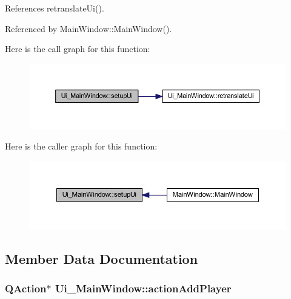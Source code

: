 References retranslate\+Ui().



Referenced by Main\+Window\+::\+Main\+Window().



Here is the call graph for this function\+:
\nopagebreak
\begin{figure}[H]
\begin{center}
\leavevmode
\includegraphics[width=350pt]{df/dd7/class_ui___main_window_acf4a0872c4c77d8f43a2ec66ed849b58_cgraph}
\end{center}
\end{figure}




Here is the caller graph for this function\+:
\nopagebreak
\begin{figure}[H]
\begin{center}
\leavevmode
\includegraphics[width=350pt]{df/dd7/class_ui___main_window_acf4a0872c4c77d8f43a2ec66ed849b58_icgraph}
\end{center}
\end{figure}




\subsection{Member Data Documentation}
\hypertarget{class_ui___main_window_af1f8925b955d4b219fed6f1a99b06cdd}{}
\subsubsection[{action\+Add\+Player}]{\setlength{\rightskip}{0pt plus 5cm}Q\+Action$\ast$ Ui\+\_\+\+Main\+Window\+::action\+Add\+Player}\label{class_ui___main_window_af1f8925b955d4b219fed6f1a99b06cdd}
\hypertarget{class_ui___main_window_a11f8049e0775309806c29c8035b22dc9}{}
